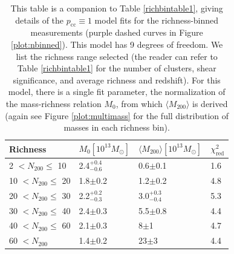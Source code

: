 \begin{landscape}
\begin{table}
\centering
    \caption[Shear Results for Richness-Binned Clusters (Perfectly Centered Model)]{This table is a companion to Table \ref{richbintable1}, giving details of the $p_{\mathrm{cc}} \equiv 1$ model fits for the richness-binned measurements (purple dashed curves in Figure \ref{plot:nbinned}). This model has 9 degrees of freedom. We list the richness range selected (the reader can refer to Table \ref{richbintable1} for the number of clusters, shear significance, and average richness and redshift). For this model, there is a single fit parameter, the normalization of the mass-richness relation $M_0$, from which $\langle M_{200} \rangle$ is derived (again see Figure \ref{plot:multimass} for the full distribution of masses in each richness bin).}
    \begin{tabular}{llll}
      \hline
      Richness & $M_0 \left[ 10^{13} M_{\odot}\right]$ & $\langle M_{200} \rangle \left[ 10^{13} M_{\odot}\right]$ & $\chi^2_{\mathrm{red}}$ \\ \hline
      2 $<N_{200}\leq$ 10 & 2.4$^{+0.4}_{-0.6}$ & 0.6$\pm$0.1 & 1.6  \\
      10 $<N_{200}\leq$ 20 & 1.8$\pm$0.2 & 1.2$\pm$0.2 & 4.8  \\
      20 $<N_{200}\leq$ 30 & 2.2$^{+0.2}_{-0.3}$ & 3.0$^{+0.3}_{-0.4}$ & 5.3  \\
      30 $<N_{200}\leq$ 40 & 2.4$\pm$0.3 & 5.5$\pm$0.8 & 4.4  \\
      40 $<N_{200}\leq$ 60 & 2.1$\pm$0.3 & 8$\pm$1 & 4.7  \\
      60 $<N_{200}$ & 1.4$\pm$0.2 & 23$\pm$3 & 4.4  \\
      \hline
    \end{tabular}
\label{richbintable2}
\end{table}


\end{landscape}
